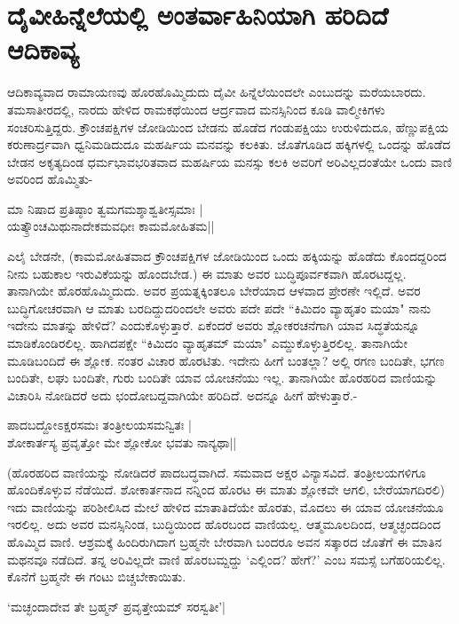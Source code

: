 \section*{ದೈವೀಹಿನ್ನೆಲೆಯಲ್ಲಿ ಅಂತರ್ವಾಹಿನಿಯಾಗಿ ಹರಿದಿದೆ ಆದಿಕಾವ್ಯ}

ಆದಿಕಾವ್ಯವಾದ ರಾಮಾಯಣವು ಹೊರಹೊಮ್ಮಿದುದು ದೈವೀ ಹಿನ್ನೆಲೆಯಿಂದಲೇ ಎಂಬುದನ್ನು ಮರೆಯಬಾರದು. ತಮಸಾತೀರದಲ್ಲಿ, ನಾರದು ಹೇಳಿದ ರಾಮಕಥೆಯಿಂದ  ಆರ್ದ್ರವಾದ ಮನಸ್ಸಿನಿಂದ ಕೂಡಿ ವಾಲ್ಮೀಕಿಗಳು ಸಂಚರಿಸುತ್ತಿದ್ದರು. ಕ್ರೌಂಚಪಕ್ಷಿಗಳ ಜೋಡಿಯಿಂದ ಬೇಡನು ಹೊಡೆದ ಗಂಡುಪಕ್ಷಿಯು ಉರುಳಿದುದೂ, ಹೆಣ್ಣುಪಕ್ಷಿಯ ಕರುಣಾರ್ದ್ರವಾಗಿ ಧ್ವನಿಮಡಿದುದೂ ಮಹರ್ಷಿಯ ಮನವನ್ನು ಕಲಕಿತು. ಜೊತೆಗೂಡಿದ ಹಕ್ಕಿಗಳಲ್ಲಿ ಒಂದನ್ನು ಹೊಡೆದ ಬೇಡನ ಅಕೃತ್ಯದಿಂಡ ಧರ್ಮಭಾವಭರಿತವಾದ ಮಹರ್ಷಿಯ ಮನಸ್ಸು ಕಲಕಿ ಅವರಿಗೆ ಅರಿವಿಲ್ಲದಂತೆಯೇ ಒಂದು ವಾಣಿ ಅವರಿಂದ ಹೊಮ್ಮಿತು-
\begin{shloka}
ಮಾ ನಿಷಾದ ಪ್ರತಿಷ್ಠಾಂ ತ್ವಮಗಮಶ್ಶಾಶ್ವತೀಸ್ಸಮಾಃ |\\
ಯತ್ಕ್ರೌಂಚಮಿಥುನಾದೇಕಮವಧೀಃ ಕಾಮಮೋಹಿತಮ||
\end{shloka}

ಎಲೈ ಬೇಡನೇ, (ಕಾಮಮೋಹಿತವಾದ ಕ್ರೌಂಚಪಕ್ಷಿಗಳ ಜೋಡಿಯಿಂದ ಒಂದು ಹಕ್ಕಿಯನ್ನು ಹೊಡೆದು ಕೊಂದದ್ದರಿಂದ ನೀನು ಬಹುಕಾಲ ಇರುವಿಕೆಯನ್ನು ಹೊಂದಬೇಡ.) ಈ ಮಾತು ಅವರ ಬುದ್ಧಿಪೂರ್ವಕವಾಗಿ ಹೊರಟದ್ದಲ್ಲ. ತಾನಾಗಿಯೇ ಹೊರಹೊಮ್ಮಿದುದು. ಅವರ ಪ್ರಯತ್ನಕ್ಕಿಂತಲೂ ಬೇರೆಯಾದ ಆಳವಾದ ಪ್ರೇರಣೇ ಇಲ್ಲಿದೆ. ಅವರ ಬುದ್ಧಿಗೋಚರವಾಗಿ ಆ ಮಾತು ಬರದಿದ್ದುದರಿಂದಲೇ ಅವರು ಪದೇ ಪದೇ ``ಕಿಮಿದಂ ವ್ಯಾಹೃತಂ ಮಯಾ" ನಾನು ಇದೇನು ಮಾತನ್ನು  ಹೇಳಿದೆ? ಎಂದುಕೊಳ್ಳುತ್ತಾರೆ. ಏಕೆಂದರೆ ಅವರು ಶ್ಲೋಕರಚನೆಗಾಗಿ ಯಾವ ಸಿದ್ಧತೆಯನ್ನೂ ಮಾಡಿಕೊಂಡಿರಲಿಲ್ಲ. ಹಾಗಿದಪಕ್ಷೇ ``ಕಿಮಿದಂ ವ್ಯಾಹೃತಮ್ ಮಯಾ" ಎಮ್ದುಕೊಳ್ಳುತ್ತಿರಲಿಲ್ಲ. ತಾನಾಗಿಯೇ ಮೂಡಿಬಂದಿದೆ ಈ ಶ್ಲೋಕ. ನಂತರ ವಿಚಾರ ಹೊರಟಿತು. ಇದೇನು ಹೀಗೆ ಬಂತಲ್ಲಾ? ಅಲ್ಲಿ ರಗಣ ಬಂದಿತೇ, ಭಗಣ ಬಂದಿತೇ, ಲಘು  ಬಂದಿತೇ, ಗುರು ಬಂದಿತೇ ಯಾವ ಯೋಚನೆಯು ಇಲ್ಲ. ತಾನಾಗಿಯೇ ಹೊರಹರಿದ ವಾಣಿಯನ್ನು ವಿಚಾರಿಸಿ ನೋಡಿದರೆ ಅದು ಛಂದೋಬದ್ದವಾಗಿಯೇ ಹರಿದಿದೆ. ಅದನ್ನೂ ಹೀಗೆ ಹೇಳುತ್ತಾರೆ.-

\begin{shloka}
ಪಾದಬದ್ದೋಽಕ್ಷರಸಮಃ ತಂತ್ರೀಲಯಸಮನ್ವಿತಃ |\\
ಶೋಕಾರ್ತಸ್ಯ ಪ್ರವೃತ್ತೋ ಮೇ ಶ್ಲೋಕೋ ಭವತು ನಾನ್ಯಥಾ||
\end{shloka}

(ಹೊರಹರಿದ ವಾಣಿಯನ್ನು ನೋಡಿದರೆ ಪಾದಬದ್ಧವಾಗಿದೆ. ಸಮವಾದ ಅಕ್ಷರ ವಿನ್ಯಾಸವಿದೆ. ತಂತ್ರೀಲಯಗಳಿಗೂ ಹೊಂದಿಕೊಳ್ಳುವ ನೆಡೆಯಿದೆ. ಶೋಕಾರ್ತನಾದ ನನ್ನಿಂದ ಹೊರಟ ಈ ಮಾತು ಶ್ಲೋಕವೇ ಆಗಲಿ, ಬೇರೆಯಾಗದಿರಲಿ) ಇದು ವಾಣಿಯನ್ನು  ಪರಿಶೀಲಿಸಿದ ಮೇಲೆ ಹೇಳಿದ ಮಾತಾತಿದೆಯೇ ಹೊರತು, ಮೊದಲು ಈ ಯಾವ ಯೋಚನೆಯೂ ಇರಲಿಲ್ಲ. ಅದು ಅವರ ಮನಸ್ಸಿನಿಂಡ, ಬುದ್ಧಿಯಿಂದ ಹೊರಬಂದ ವಾಣಿಯಲ್ಲ. ಆತ್ಮಮೂಲದಿಂದ, ಆತ್ಮಚ್ಛಂದದಿಂದ ಹೊಮ್ಮಿದ ವಾಣಿ. ಆಶ್ರಮಕ್ಕೆ ಹಿಂದಿರುಗಿದಾಗ ಬ್ರಹ್ಮನೇ ಬೇರವಾಗಿ ಬಂದರೂ ಅವನ ಸತ್ಕಾರದ ಜೊತೆಗೆ ಈ ಮಾತಿನ ಮಥನವೂ ನಡೆದಿದೆ. ತನ್ನ ಅರಿವಿಲ್ಲದೇ ವಾಣಿ ಹೊರಬಮ್ದದ್ದು `ಎಲ್ಲಿಂದ? ಹೇಗೆ?' ಎಂಬ ಸಮಸ್ಸೆ ಬಗೆಹರಿಯಲಿಲ್ಲ. ಕೊನೆಗೆ ಬ್ರಹ್ಮನೇ ಈ ಗಂಟು ಬಿಚ್ಚಬೇಕಾಯಿತು.
\begin{shloka}
`ಮಚ್ಛಂದಾದೇವ ತೇ ಬ್ರಹ್ಮನ್ ಪ್ರವೃತ್ತೇಯಮ್ ಸರಸ್ವತೀ'|
\end{shloka}


